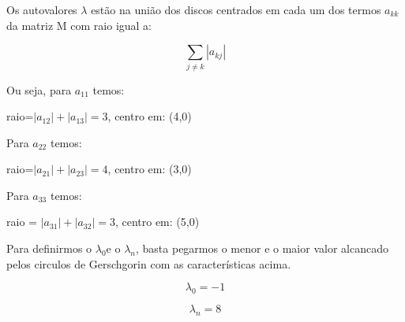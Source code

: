 \begin{example}
Os autovalores $\lambda$ estão na união dos discos centrados em cada
um dos termos $a_{kk}$ da matriz M com raio igual a:

\[
\sum_{j\neq k}|a_{kj}|\]


Ou seja, para $a_{11}$ temos:

\begin{center}
raio=$|a_{12}|+|a_{13}|=3$, centro em: (4,0)
\par\end{center}

Para $a_{22}$ temos:

\begin{center}
raio=$|a_{21}|+|a_{23}|=4$, centro em: (3,0)
\par\end{center}

Para $a{}_{33}$ temos:

\begin{center}
raio = $|a_{31}|+|a_{32}|=3$, centro em: (5,0)
\par\end{center}

Para definirmos o $\lambda_{0}$e o $\lambda_{n}$, basta pegarmos
o menor e o maior valor alcancado pelos circulos de Gerschgorin com
as características acima.

\[
\lambda_{0}=-1\]


\[
\lambda_{n}=8\]

\end{example}

